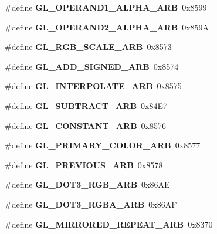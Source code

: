 \begin{DoxyCompactItemize}
\item 
\#define {\bfseries G\+L\+\_\+\+O\+P\+E\+R\+A\+N\+D1\+\_\+\+A\+L\+P\+H\+A\+\_\+\+A\+R\+B}~0x8599\label{_s_d_l__opengl_8h_af7c8b6f1a758bad73c2d66d211b3facf}

\item 
\#define {\bfseries G\+L\+\_\+\+O\+P\+E\+R\+A\+N\+D2\+\_\+\+A\+L\+P\+H\+A\+\_\+\+A\+R\+B}~0x859\+A\label{_s_d_l__opengl_8h_ab2370c3879e2e722fb97f5d8d4917ad3}

\item 
\#define {\bfseries G\+L\+\_\+\+R\+G\+B\+\_\+\+S\+C\+A\+L\+E\+\_\+\+A\+R\+B}~0x8573\label{_s_d_l__opengl_8h_a8790c9d55cf268a27d1c8ceffcee2f96}

\item 
\#define {\bfseries G\+L\+\_\+\+A\+D\+D\+\_\+\+S\+I\+G\+N\+E\+D\+\_\+\+A\+R\+B}~0x8574\label{_s_d_l__opengl_8h_a2beaca3371ab12a8a2870eb9f3dbc10f}

\item 
\#define {\bfseries G\+L\+\_\+\+I\+N\+T\+E\+R\+P\+O\+L\+A\+T\+E\+\_\+\+A\+R\+B}~0x8575\label{_s_d_l__opengl_8h_ac825a742197eb5727fbab86125fabd0e}

\item 
\#define {\bfseries G\+L\+\_\+\+S\+U\+B\+T\+R\+A\+C\+T\+\_\+\+A\+R\+B}~0x84\+E7\label{_s_d_l__opengl_8h_a07084a221a5e2f372d7d3e38df084aea}

\item 
\#define {\bfseries G\+L\+\_\+\+C\+O\+N\+S\+T\+A\+N\+T\+\_\+\+A\+R\+B}~0x8576\label{_s_d_l__opengl_8h_aeafd5182e917fd57c02593acfaf4cc37}

\item 
\#define {\bfseries G\+L\+\_\+\+P\+R\+I\+M\+A\+R\+Y\+\_\+\+C\+O\+L\+O\+R\+\_\+\+A\+R\+B}~0x8577\label{_s_d_l__opengl_8h_ae92ed5bf4c9ea82af212731519e4f954}

\item 
\#define {\bfseries G\+L\+\_\+\+P\+R\+E\+V\+I\+O\+U\+S\+\_\+\+A\+R\+B}~0x8578\label{_s_d_l__opengl_8h_a24a4ee159c9974051295a0950c76c865}

\item 
\#define {\bfseries G\+L\+\_\+\+D\+O\+T3\+\_\+\+R\+G\+B\+\_\+\+A\+R\+B}~0x86\+A\+E\label{_s_d_l__opengl_8h_a8129362f88866ded868ebba6630b073c}

\item 
\#define {\bfseries G\+L\+\_\+\+D\+O\+T3\+\_\+\+R\+G\+B\+A\+\_\+\+A\+R\+B}~0x86\+A\+F\label{_s_d_l__opengl_8h_a198597e26e0321ba98c303b2fa218be7}

\item 
\#define {\bfseries G\+L\+\_\+\+M\+I\+R\+R\+O\+R\+E\+D\+\_\+\+R\+E\+P\+E\+A\+T\+\_\+\+A\+R\+B}~0x8370\label{_s_d_l__opengl_8h_a2c7182f052dec2409bdcf35ccd753bc9}


\end{DoxyCompactItemize}
